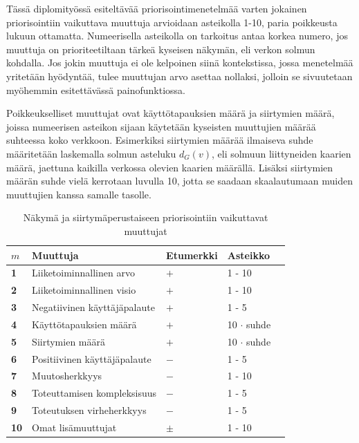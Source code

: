   Tässä diplomityössä esiteltävää priorisointimenetelmää varten jokainen priorisointiin vaikuttava muuttuja arvioidaan asteikolla 1-10, paria poikkeusta lukuun ottamatta.
  Numeerisella asteikolla on tarkoitus antaa korkea numero, jos muuttuja on prioriteetiltaan tärkeä kyseisen näkymän, eli verkon solmun kohdalla.
  Jos jokin muuttuja ei ole kelpoinen siinä kontekstissa, jossa menetelmää yritetään hyödyntää, tulee muuttujan arvo asettaa nollaksi, jolloin se sivuutetaan myöhemmin esitettävässä painofunktiossa.

  Poikkeukselliset muuttujat ovat käyttötapauksien määrä ja siirtymien määrä, joissa numeerisen asteikon sijaan käytetään kyseisten muuttujien määrää suhteessa koko verkkoon.
  Esimerkiksi siirtymien määrää ilmaiseva suhde määritetään laskemalla solmun asteluku \(d_G(v)\), eli solmuun liittyneiden kaarien määrä, jaettuna kaikilla verkossa olevien kaarien määrällä.
  Lisäksi siirtymien määrän suhde vielä kerrotaan luvulla 10, jotta se saadaan skaalautumaan muiden muuttujien kanssa samalle tasolle.

  \begin{table}[H]
    \caption{Näkymä ja siirtymäperustaiseen priorisointiin vaikuttavat muuttujat}
    \label{tab:priorisointiin_vaikuttavat_muuttujat}
    \centering
    \begin{tabular}{lllll} \hline
    \(m\) & \textbf{Muuttuja} & \textbf{Etumerkki} & \textbf{Asteikko} &  \\ \hline
    \textbf{1} & Liiketoiminnallinen arvo & \(+\) & 1 - 10 &  \\
    \textbf{2} & Liiketoiminnallinen visio & \(+\) & 1 - 10 &  \\
    \textbf{3} & Negatiivinen käyttäjäpalaute & \(+\) & 1 - 5 &  \\
    \textbf{4} & Käyttötapauksien määrä & \(+\) & 10 \(\cdot\) suhde &  \\
    \textbf{5} & Siirtymien määrä & \(+\) & 10 \(\cdot\) suhde &  \\
    \textbf{6} & Positiivinen käyttäjäpalaute & \(-\) & 1 - 5 &  \\
    \textbf{7} & Muutosherkkyys & \(-\) & 1 - 10 &  \\
    \textbf{8} & Toteuttamisen kompleksisuus & \(-\) & 1 - 5 &  \\
    \textbf{9} & Toteutuksen virheherkkyys & \(-\) & 1 - 5 &  \\
    \textbf{10} & Omat lisämuuttujat & \(\pm\) & 1 - 10 & \\ \hline
    \end{tabular}
  \end{table}

